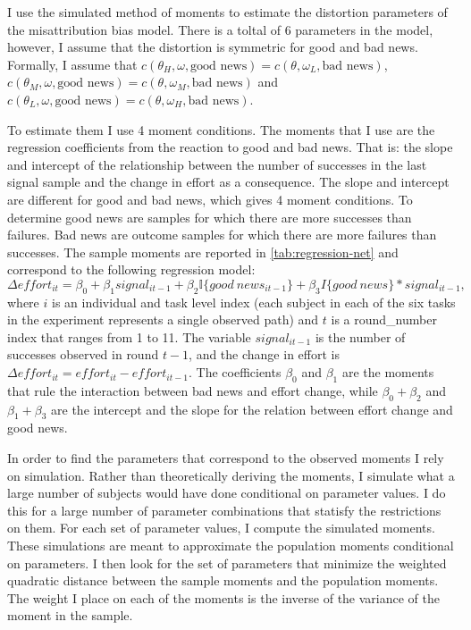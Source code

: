\documentclass[
  12pt,
]{article}
\begin{document}
I use the simulated method of moments to estimate the distortion
parameters of the misattribution bias model. There is a toltal of 6
parameters in the model, however, I assume that the distortion is
symmetric for good and bad news. Formally, I assume that
\(c(\theta_H, \omega, \text{good news})=c(\theta, \omega_L, \text{bad news})\),
\(c(\theta_M, \omega, \text{good news})=c(\theta, \omega_M, \text{bad news})\)
and
\(c(\theta_L, \omega, \text{good news})=c(\theta, \omega_H, \text{bad news})\).

To estimate them I use 4 moment conditions. The moments that I use are
the regression coefficients from the reaction to good and bad news. That
is: the slope and intercept of the relationship between the number of
successes in the last signal sample and the change in effort as a
consequence. The slope and intercept are different for good and bad
news, which gives 4 moment conditions. To determine good news are
samples for which there are more successes than failures. Bad news are
outcome samples for which there are more failures than successes. The
sample moments are reported in \ref{tab:regression-net} and correspond
to the following regression model:
\[ \Delta effort_{it} = \beta_0 + \beta_1 signal_{i t-1} + \beta_2\mathbb{I}\{good \:news_{i t-1}\} + \beta_3{I}\{good\:news\}*signal_{i t-1}, \]
where \(i\) is an individual and task level index (each subject in each
of the six tasks in the experiment represents a single observed path)
and \(t\) is a round\_number index that ranges from 1 to 11. The
variable \(signal_{i t-1}\) is the number of successes observed in round
\(t-1\), and the change in effort is
\(\Delta effort_{it}=effort_{it}-effort_{it-1}\). The coefficients
\(\beta_0\) and \(\beta_1\) are the moments that rule the interaction
between bad news and effort change, while \(\beta_0+\beta_2\) and
\(\beta_1 +\beta_3\) are the intercept and the slope for the relation
between effort change and good news.

In order to find the parameters that correspond to the observed moments
I rely on simulation. Rather than theoretically deriving the moments, I
simulate what a large number of subjects would have done conditional on
parameter values. I do this for a large number of parameter combinations
that statisfy the restrictions on them. For each set of parameter
values, I compute the simulated moments. These simulations are meant to
approximate the population moments conditional on parameters. I then
look for the set of parameters that minimize the weighted quadratic
distance between the sample moments and the population moments. The
weight I place on each of the moments is the inverse of the variance of
the moment in the sample.
\end{document}
